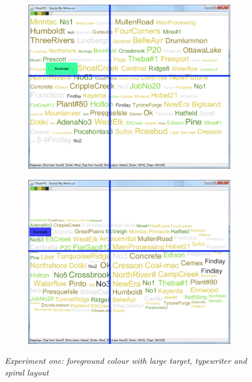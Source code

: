 \begin{figure}[!htb]
\begin{subfigure}{.5\textwidth}
  \includegraphics[scale=0.25]{Experiment1/Trial4/C2S2L2.png}
\end{subfigure}%
\begin{subfigure}{.5\textwidth}
  \centering
 \includegraphics[scale=0.25]{Experiment1/Trial4/C2S2L1.png}
\end{subfigure}
\caption{\textit{Experiment one: foreground colour with large target, typewriter and spiral layout}}
\label{fig:target1}
\end{figure}

